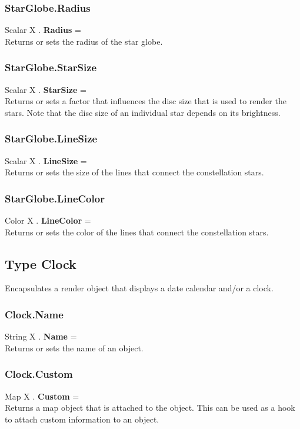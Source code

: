 \documentclass[10pt]{book}
\begin{document}
\subsubsection{StarGlobe.Radius \label{F:StarGlobe:Radius}}
Scalar X . \textbf{Radius} = \\
Returns or sets the radius of the star globe.

\subsubsection{StarGlobe.StarSize \label{F:StarGlobe:StarSize}}
Scalar X . \textbf{StarSize} = \\
Returns or sets a factor that influences the disc size that is used to render the stars. Note that the disc size of an individual star depends on its brightness.

\subsubsection{StarGlobe.LineSize \label{F:StarGlobe:LineSize}}
Scalar X . \textbf{LineSize} = \\
Returns or sets the size of the lines that connect the constellation stars.

\subsubsection{StarGlobe.LineColor \label{F:StarGlobe:LineColor}}
Color X . \textbf{LineColor} = \\
Returns or sets the color of the lines that connect the constellation stars.

\subsection{Type Clock \label{T:Clock}}
Encapsulates a render object that displays a date calendar and/or a clock.

\subsubsection{Clock.Name \label{F:Clock:Name}}
String X . \textbf{Name} = \\
Returns or sets the name of an object.

\subsubsection{Clock.Custom \label{F:Clock:Custom}}
Map X . \textbf{Custom} = \\
Returns a map object that is attached to the object. This can be used as a hook to attach custom information to an object.
\end{document}
